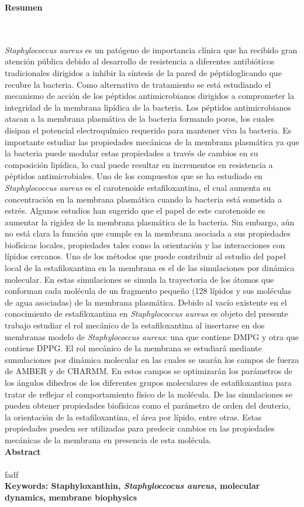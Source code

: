 \newpage
\textbf{\LARGE Resumen}
\\\\
\textit{Staphylococcus aureus} es un pat\'{o}geno de importancia cl\'{i}nica que ha recibido gran atenci\'{o}n p\'{u}blica debido al desarrollo de resistencia a diferentes antibi\'{o}ticos tradicionales dirigidos a inhibir la s\'{i}ntesis de la pared de p\'{e}ptidoglicando que recubre la bacteria. Como alternativa de tratamiento se est\'{a} estudiando el mecanismo de acci\'{o}n de los p\'{e}ptidos antimicrobianos dirigidos a comprometer la integridad de la membrana lip\'{i}dica de la bacteria. Los p\'{e}ptidos antimicrobianos atacan a la membrana plasm\'{a}tica de la bacteria formando poros, los cuales disipan el potencial electroqu\'{i}mico requerido para mantener viva la bacteria. Es importante estudiar las propiedades mec\'{a}nicas de la membrana plasm\'{a}tica ya que la bacteria puede modular estas propiedades a trav\'{e}s de cambios en su composici\'{o}n lip\'{i}dica, lo cual puede resultar en incrementos en resistencia a p\'{e}ptidos antimicrobiales. Uno de los compuestos que se ha estudiado en \textit{Staphylococcus aureus} es  el carotenoide estafiloxantina, el cual aumenta  su concentraci\'{o}n en la membrana plasm\'{a}tica cuando la bacteria est\'{a} sometida a estr\'{e}s. Algunos estudios han sugerido que el papel de este carotenoide es aumentar la rigidez de la membrana plasm\'{a}tica de la bacteria. Sin embargo, a\'{u}n no est\'{a} clara la funci\'{o}n que cumple en la membrana asociada a sus propiedades biof\'{i}sicas locales, propiedades tales como la orientaci\'{o}n y las interacciones con l\'{i}pidos cercanos. Uno de los m\'{e}todos que puede contribuir al estudio del papel local de la estafiloxantina en la membrana es el de las simulaciones por din\'{a}mica molecular. En estas simulaciones se simula la trayectoria de los \'{a}tomos que conforman cada mol\'{e}cula de un fragmento peque\~no (128 l\'{i}pidos y sus mol\'{e}culas de agua asociadas) de la membrana plasm\'{a}tica.
Debido al vac\'{i}o existente en el conocimiento de estafiloxantina en \textit{Staphylococcus aureus} es objeto del presente trabajo estudiar el rol mec\'{a}nico de la estafiloxantina al insertarse en dos membranas modelo de \textit{Staphylococcus aureus}: una que contiene DMPG y otra que contiene DPPG. El rol mec\'{a}nico de la membrana se estudiar\'{a} mediante sumulaciones por din\'{a}mica molecular en las cuales se usar\'{a}n los campos de fuerza de AMBER y de CHARMM. En estos campos se optimizar\'{a}n los par\'{a}metros de los \'{a}ngulos dihedros de los diferentes grupos moleculares de estafiloxantina para tratar de reflejar el comportamiento f\'{i}sico de la mol\'{e}cula. De las simulaciones se pueden obtener propiedades biof\'{i}sicas como el par\'{a}metro de orden del deuterio, la orientaci\'{o}n de la estafiloxantina, el \'{a}rea por l\'{i}pido, entre otras. Estas propiedades pueden ser utilizadas para predecir cambios en las propiedades mec\'{a}nicas de la membrana en presencia de esta mol\'{e}cula.\\[2.0cm]
\textbf{\LARGE Abstract}\\\\
fadf\\[2.0cm]
\textbf{\small Keywords: Staphyloxanthin, \textit{Staphyloccocus aureus}, molecular dynamics, membrane biophysics}\\